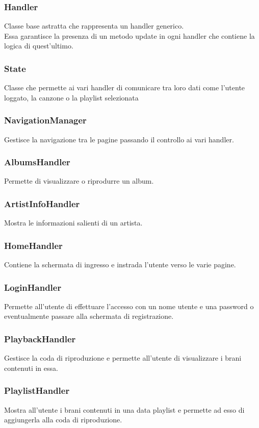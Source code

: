 \documentclass{article}
\begin{document}
  \subsubsection{Handler}
  Classe base astratta che rappresenta un handler generico.\\
  Essa garantisce la presenza di un metodo update in ogni handler che contiene la logica di quest'ultimo.
  \subsubsection{State}
  Classe che permette ai vari handler di comunicare tra loro dati come
  l'utente loggato, la canzone o la playlist selezionata
  \subsubsection{NavigationManager}
  Gestisce la navigazione tra le pagine passando il controllo ai vari handler.
  \subsubsection{AlbumsHandler}
  Permette di visualizzare o riprodurre un album.
  \subsubsection{ArtistInfoHandler}
  Mostra le informazioni salienti di un artista.
  \subsubsection{HomeHandler}
  Contiene la schermata di ingresso e instrada l'utente verso le varie pagine.
  \subsubsection{LoginHandler}
  Permette all'utente di effettuare l'accesso con un nome utente e una password o
  eventualmente passare alla schermata di registrazione.
  \subsubsection{PlaybackHandler}
  Gestisce la coda di riproduzione e permette all'utente di visualizzare i
  brani contenuti in essa.
  \subsubsection{PlaylistHandler}
  Mostra all'utente i brani contenuti in una data playlist e permette ad esso di
  aggiungerla alla coda di riproduzione.
\end{document}
